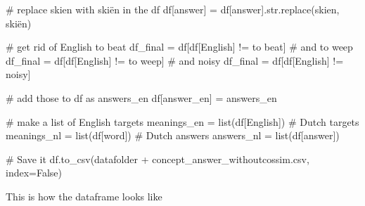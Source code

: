 \documentclass[
  letterpaper,
  DIV=11,
  numbers=noendperiod]{scrreprt}
\newenvironment{Shaded}{\begin{snugshade}}{\end{snugshade}}
\newcommand{\BuiltInTok}[1]{\textcolor[rgb]{0.00,0.23,0.31}{#1}}
\newcommand{\CommentTok}[1]{\textcolor[rgb]{0.37,0.37,0.37}{#1}}
\newcommand{\NormalTok}[1]{\textcolor[rgb]{0.00,0.23,0.31}{#1}}
\newcommand{\OperatorTok}[1]{\textcolor[rgb]{0.37,0.37,0.37}{#1}}
\newcommand{\StringTok}[1]{\textcolor[rgb]{0.13,0.47,0.30}{#1}}
\newcommand{\VariableTok}[1]{\textcolor[rgb]{0.07,0.07,0.07}{#1}}
\begin{document}
\begin{Shaded}
\begin{Highlighting}[]
\CommentTok{\# replace skien with skiën in the df}
\NormalTok{df[}\StringTok{\textquotesingle{}answer\textquotesingle{}}\NormalTok{] }\OperatorTok{=}\NormalTok{ df[}\StringTok{\textquotesingle{}answer\textquotesingle{}}\NormalTok{].}\BuiltInTok{str}\NormalTok{.replace(}\StringTok{\textquotesingle{}skien\textquotesingle{}}\NormalTok{, }\StringTok{\textquotesingle{}skiën\textquotesingle{}}\NormalTok{)}

\CommentTok{\# get rid of English \textquotesingle{}to beat\textquotesingle{}}
\NormalTok{df\_final }\OperatorTok{=}\NormalTok{ df[df[}\StringTok{\textquotesingle{}English\textquotesingle{}}\NormalTok{] }\OperatorTok{!=} \StringTok{\textquotesingle{}to beat\textquotesingle{}}\NormalTok{]}
\CommentTok{\# and to weep}
\NormalTok{df\_final }\OperatorTok{=}\NormalTok{ df[df[}\StringTok{\textquotesingle{}English\textquotesingle{}}\NormalTok{] }\OperatorTok{!=} \StringTok{\textquotesingle{}to weep\textquotesingle{}}\NormalTok{]}
\CommentTok{\# and noisy}
\NormalTok{df\_final }\OperatorTok{=}\NormalTok{ df[df[}\StringTok{\textquotesingle{}English\textquotesingle{}}\NormalTok{] }\OperatorTok{!=} \StringTok{\textquotesingle{}noisy\textquotesingle{}}\NormalTok{]}

\CommentTok{\# add those to df as answers\_en}
\NormalTok{df[}\StringTok{\textquotesingle{}answer\_en\textquotesingle{}}\NormalTok{] }\OperatorTok{=}\NormalTok{ answers\_en}

\CommentTok{\# make a list of English targets}
\NormalTok{meanings\_en }\OperatorTok{=} \BuiltInTok{list}\NormalTok{(df[}\StringTok{\textquotesingle{}English\textquotesingle{}}\NormalTok{])}
\CommentTok{\# Dutch targets}
\NormalTok{meanings\_nl }\OperatorTok{=} \BuiltInTok{list}\NormalTok{(df[}\StringTok{\textquotesingle{}word\textquotesingle{}}\NormalTok{])}
\CommentTok{\# Dutch answers}
\NormalTok{answers\_nl }\OperatorTok{=} \BuiltInTok{list}\NormalTok{(df[}\StringTok{\textquotesingle{}answer\textquotesingle{}}\NormalTok{])}

\CommentTok{\# Save it}
\NormalTok{df.to\_csv(datafolder }\OperatorTok{+} \StringTok{\textquotesingle{}concept\_answer\_withoutcossim.csv\textquotesingle{}}\NormalTok{, index}\OperatorTok{=}\VariableTok{False}\NormalTok{)}
\end{Highlighting}
\end{Shaded}

This is how the dataframe looks like
\end{document}
